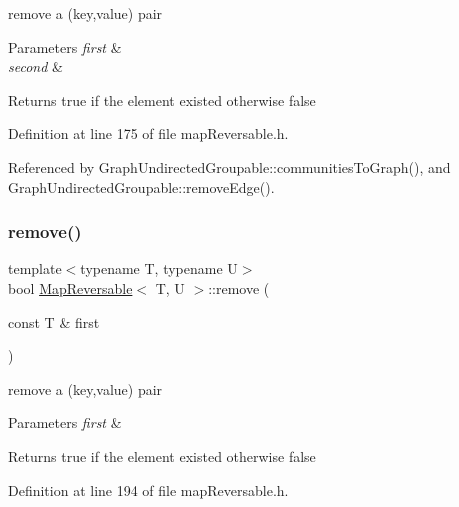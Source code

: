 remove a (key,value) pair 
\begin{DoxyParams}{Parameters}
{\em first} & \\
\hline
{\em second} & \\
\hline
\end{DoxyParams}
\begin{DoxyReturn}{Returns}
true if the element existed otherwise false 
\end{DoxyReturn}


Definition at line 175 of file map\+Reversable.\+h.



Referenced by Graph\+Undirected\+Groupable\+::communities\+To\+Graph(), and Graph\+Undirected\+Groupable\+::remove\+Edge().

\mbox{\label{classMapReversable_a4568cc0ec74160de575382d48b4d6636}} 
\subsubsection{\texorpdfstring{remove()}{remove()}\hspace{0.1cm}{\footnotesize\ttfamily [2/2]}}
{\footnotesize\ttfamily template$<$typename T, typename U$>$ \\
bool \hyperlink{classMapReversable}{Map\+Reversable}$<$ T, U $>$\+::remove (\begin{DoxyParamCaption}\item[{const T \&}]{first }\end{DoxyParamCaption})\hspace{0.3cm}{\ttfamily [inline]}}

remove a (key,value) pair 
\begin{DoxyParams}{Parameters}
{\em first} & \\
\hline
\end{DoxyParams}
\begin{DoxyReturn}{Returns}
true if the element existed otherwise false 
\end{DoxyReturn}


Definition at line 194 of file map\+Reversable.\+h.

\mbox{\label{classMapReversable_a2d70db0cb1f28dc57a7efe9da6155f63}} 

